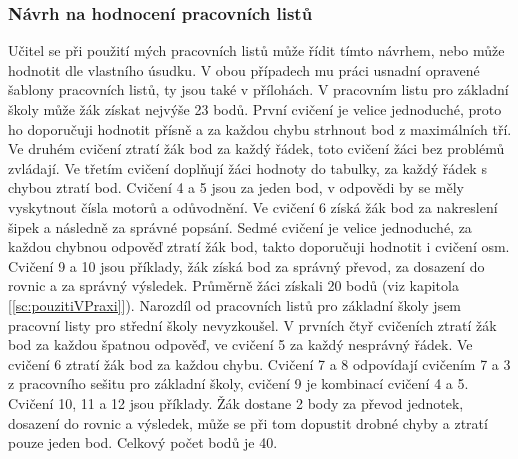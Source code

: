 \subsubsection{Návrh na hodnocení pracovních listů}
{Učitel se při použití mých pracovních listů může řídit tímto návrhem, nebo může hodnotit dle vlastního úsudku. V obou případech mu práci usnadní opravené šablony pracovních listů, ty jsou také v přílohách.}\odst
{V pracovním listu pro základní školy může žák získat nejvýše 23 bodů. První cvičení je velice jednoduché, proto ho doporučuji hodnotit přísně a za každou chybu strhnout bod z maximálních tří. Ve druhém cvičení ztratí žák bod za každý řádek, toto cvičení žáci bez problémů zvládají. Ve třetím cvičení doplňují žáci hodnoty do tabulky, za každý řádek s chybou ztratí bod. Cvičení 4 a 5 jsou za jeden bod, v odpovědi by se měly vyskytnout čísla motorů a odůvodnění. Ve cvičení 6 získá žák bod za nakreslení šipek a následně za správné popsání. Sedmé cvičení je velice jednoduché, za každou chybnou odpověď ztratí žák bod, takto doporučuji hodnotit i cvičení osm. Cvičení 9 a 10 jsou příklady, žák získá bod za správný převod, za dosazení do rovnic a za správný výsledek. Průměrně žáci získali 20 bodů (viz kapitola  [\ref{sc:pouzitiVPraxi}]).}\odst
{Narozdíl od pracovních listů pro základní školy jsem pracovní listy pro střední školy nevyzkoušel. V prvních čtyř cvičeních ztratí žák bod za každou špatnou odpověď, ve cvičení 5 za každý nesprávný řádek. Ve cvičení 6 ztratí žák bod za každou chybu. Cvičení 7 a 8 odpovídají cvičením 7 a 3 z pracovního sešitu pro základní školy, cvičení 9 je kombinací cvičení 4 a 5. Cvičení 10, 11 a 12 jsou příklady. Žák dostane 2 body za převod jednotek, dosazení do rovnic a výsledek, může se při tom dopustit drobné chyby a ztratí pouze jeden bod. Celkový počet bodů je 40.}
\newpage
